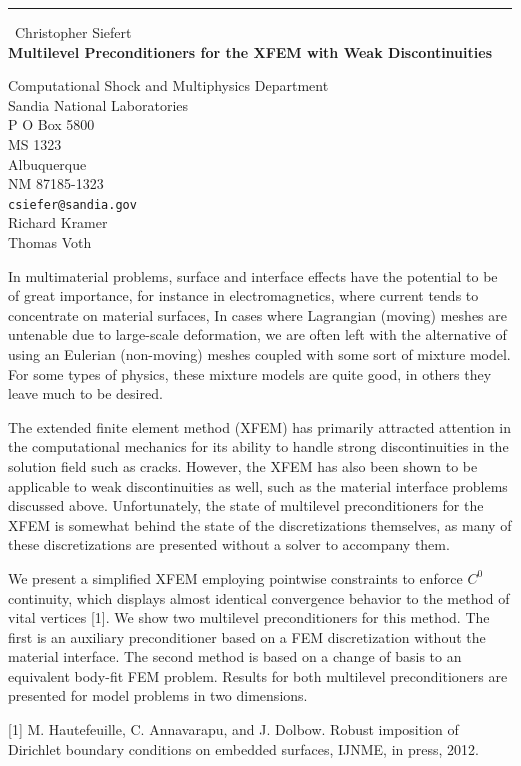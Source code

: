 \documentclass{report}
\begin{document}
\begin{center}
\rule{6in}{1pt} \
{\large Christopher Siefert \\
{\bf Multilevel Preconditioners for the XFEM with Weak Discontinuities}}

Computational Shock and Multiphysics Department \\ Sandia National Laboratories \\ P O Box 5800 \\ MS 1323 \\ Albuquerque \\ NM 87185-1323
\\
{\tt csiefer@sandia.gov}\\
Richard Kramer\\
Thomas Voth\end{center}

In multimaterial problems, surface and interface effects have the
potential to be of great importance, for instance in electromagnetics,
where current tends to concentrate on material surfaces, In cases
where Lagrangian (moving) meshes are untenable due to large-scale
deformation, we are often left with the alternative of using an
Eulerian (non-moving) meshes coupled with some sort of mixture model.
For some types of physics, these mixture models are quite good, in others they
leave much to be desired.

The extended finite element method (XFEM) has primarily attracted attention
in the computational mechanics for its ability to handle strong
discontinuities in the solution field such as cracks. However, the XFEM
has also been shown to be applicable to weak discontinuities as well,
such as the material interface problems discussed above.
Unfortunately, the state of multilevel preconditioners for the XFEM
is somewhat behind the state of the discretizations themselves, as
many of these discretizations are presented without a solver to
accompany them.

We present a simplified XFEM employing pointwise constraints to
enforce $C^0$ continuity, which displays almost identical convergence
behavior to the method of vital vertices [1]. We show two
multilevel preconditioners for this method. The first is an auxiliary
preconditioner based on a FEM discretization without the material
interface. The second method is based on a change of basis to an
equivalent body-fit FEM problem. Results for both multilevel
preconditioners are presented for model problems in two dimensions.


[1] M. Hautefeuille, C. Annavarapu, and J. Dolbow. Robust imposition
of Dirichlet boundary conditions on embedded surfaces, IJNME, in
press, 2012.
\end{document}
